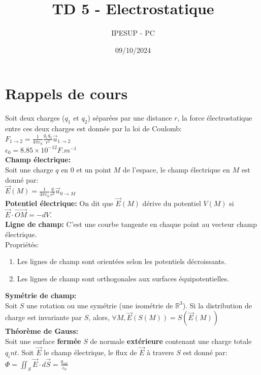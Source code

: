 \documentclass{article}
\title{TD 5 - Electrostatique}
\author{IPESUP - PC }
\date{09/10/2024}
\begin{document}
\maketitle

\section{Rappels de cours}

Soit deux charges ($q_1 \text{ et } q_2$) séparées par une distance $r$, la force électrostatique entre ces deux charges est donnée par la loi de Coulomb:\\[0.2cm]
$F_{1 \rightarrow 2} = \frac{1}{4\pi \varepsilon_0} \frac{q_1 q_2}{r^2} \vec{u}_{1 \rightarrow 2}$\\
$\epsilon_0 = 8.85 \times 10^{-12} { F.m^{-1}}$\\[0.1cm]

\textbf{Champ électrique:}\\[0.1cm]
Soit une charge $q$ en $0$ et un point $M$ de l'espace, le champ électrique en $M$ est donné par:\\
$\vec{E}(M) = \frac{1}{4\pi \varepsilon_0} \frac{q}{r^2} \vec{u}_{0 \rightarrow M}$\\

\textbf{Potentiel électrique:} On dit que $\vec{E}(M)$ dérive du potentiel $V(M)$ si $\vec{E} \cdot \vec{OM} = -dV$.\\[0.1cm]

\textbf{Ligne de champ: } C'est une courbe tangente en chaque point au vecteur champ électrique.\\[0.1cm]
Propriétés: 
\begin{enumerate}
    \item Les lignes de champ sont orientées selon les potentiels décroissants.
    \item Les lignes de champ sont orthogonales aux surfaces équipotentielles.\\
\end{enumerate}

\textbf{Symétrie de champ: }\\[0.1cm]
Soit $S$ une rotation ou une symétrie (une isométrie de $\mathbb{R}^3$). Si la distribution  de charge est invariante par $S$, alors, $\forall M, \vec{E}(S(M)) = S(\vec{E}(M))$\\ 

\textbf{Théorème de Gauss: }\\[0.1cm]
Soit une surface \textbf{fermée} $S$ de normale \textbf{extérieure} contenant une charge totale $q_int$. Soit $\vec{E}$ le champ électrique, le flux de $\vec{E}$ à travers $S$ est donné par:\\
$\Phi = \iint_S \vec{E} \cdot d\vec{S} = \frac{q_{int}}{\varepsilon_0}$\\
\end{document}
